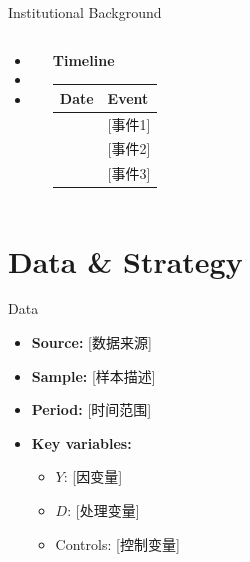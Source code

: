 \documentclass[aspectratio=169,11pt]{beamer}
\begin{document}
\begin{frame}{Institutional Background}
\begin{columns}
\begin{itemize}
    \item [政策/制度描述]
    \item [关键时间节点]
    \item [适用范围]
\end{itemize}

\begin{center}
\textbf{Timeline}\\[0.5em]
\begin{tabular}{ll}
\toprule
Date & Event \\
\midrule
[日期] & [事件1] \\
[日期] & [事件2] \\
[日期] & [事件3] \\
\bottomrule
\end{tabular}
\end{center}
\end{columns}
\end{frame}


\section{Data \& Strategy}

\begin{frame}{Data}
\begin{itemize}
    \item \textbf{Source:} [数据来源]
    \item \textbf{Sample:} [样本描述]
    \item \textbf{Period:} [时间范围]
    \item \textbf{Key variables:}
    \begin{itemize}
        \item $Y$: [因变量]
        \item $D$: [处理变量]
        \item Controls: [控制变量]
    \end{itemize}
\end{itemize}
\end{frame}
\end{document}
